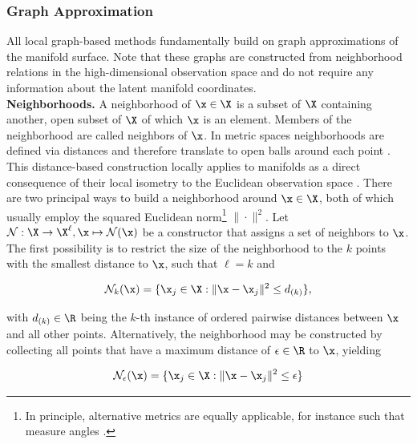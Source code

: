 
\subsubsection{Graph Approximation}
\label{graph}

All local graph-based methods fundamentally build on graph approximations of the 
manifold surface.
Note that these graphs are constructed from neighborhood relations in the 
high-dimensional observation space and do not require any information about the 
latent manifold coordinates.
\\

\textbf{Neighborhoods.} 
A neighborhood of $\x \in \X$ is a subset of $\X$ containing another, open 
subset of $\X$ of which $\x$ is an element.
Members of the neighborhood are called neighbors of $\x$.
In metric spaces neighborhoods are defined via distances and therefore 
translate to open balls around each point \citep{waldmann2014}.
This distance-based construction locally applies to manifolds as a direct 
consequence of their local isometry to the Euclidean observation space 
\citep{mafu2011}.
There are two principal ways to build a neighborhood around $\x \in \X$, 
both of which usually employ the squared Euclidean norm\footnote{
In principle, alternative metrics are equally applicable, for instance such 
that measure angles \citep{belkinniyogi2004}.
} $\| \cdot \|^2$.
Let $\mathcal{N}: \X \rightarrow \X^{\ell}, \x \mapsto \mathcal{N} (\x)$ be a 
constructor that assigns a set of neighbors to $\x$.
The first possibility is to restrict the size of the neighborhood to the $k$ 
points with the smallest distance to $\x$, such that
$\ell = k$ and 

\begin{equation}
  \mathcal{N}_k(\x) = \{\x_j \in \X: \| \x - \x_j \|^2 \leq d_{(k)}\},
  \label{eq-kneighborhood}
\end{equation}

with $d_{(k)} \in \R$ being the $k$-th instance of ordered pairwise distances 
between $\x$ and all other points.
Alternatively, the neighborhood may be constructed by collecting all points that
have a maximum distance of $\epsilon \in \R$ to $\x$, yielding 

\begin{equation}
  \mathcal{N}_{\epsilon} (\x) = \{\x_j \in \X: \| \x - \x_j \|^2 \leq \epsilon\}
  \label{eq-epsneighborhood}
\end{equation}

